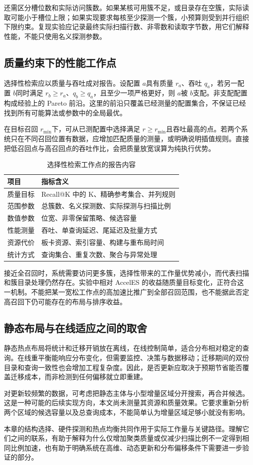 还需区分槽位数和实际访问簇数。如果某核可用簇不足，或目录存在空簇，实际读取可能小于槽位上限；如果实现要求每核至少探测一个簇，小预算则受到并行组织下限约束。复现实验应记录最终实际扫描行数、非零数和读取字节数，用它们解释性能，不能只使用名义探测参数。

\subsection{质量约束下的性能工作点}
选择性检索应以质量与吞吐成对报告。设配置 $a$具有质量 $r_a$、吞吐 $q_a$，若另一配置 $b$同时满足 $r_b\geq r_a$、$q_b\geq q_a$，且至少一项严格更好，则 $a$被 $b$支配。非支配配置构成经验上的 Pareto 前沿。这里的前沿只覆盖已经测量的配置集合，不保证已经找到所有可能算法或参数中的全局最优。

在目标召回 $r_{\min}$下，可从已测配置中选择满足 $r\geq r_{\min}$且吞吐最高的点。若两个系统只在不同召回位置有数据，应增加匹配质量的测量，或明确说明插值规则。直接把低召回点与高召回点的吞吐作比，会把质量放宽误算为纯执行优势。

\begin{table}[htbp]\centering\caption{选择性检索工作点的报告内容}
\begin{tabularx}{\textwidth}{p{2.8cm}X}\toprule
项目&指标含义\\\midrule
质量目标&Recall@K 中的 K、精确参考集合、并列规则\\
范围参数&总簇数、名义探测数、实际探测与扫描比例\\
数值参数&位宽、非零保留策略、候选容量\\
性能测量&吞吐、单查询延迟、尾延迟及批量方式\\
资源代价&板卡资源、索引容量、构建与重布局时间\\
统计方式&查询集合、重复次数、聚合与异常处理\\\bottomrule
\end{tabularx}\end{table}

接近全召回时，系统需要访问更多簇，选择性带来的工作量优势减小，而代表扫描和簇目录处理仍然存在。实验中相对 AccelES 的收益随质量目标变化，正符合这一机制。不能把某一宽松工作点的高加速比推广到全部召回范围，也不能据此否定高召回下仍可能存在的布局与排序收益。

\subsection{静态布局与在线适应之间的取舍}
静态热点布局将统计和迁移开销放在离线，在线控制简单，适合分布相对稳定的查询。在线重平衡能响应分布变化，但需要监控、决策与数据移动；迁移期间的双份目录和查询一致性也会增加工程复杂度。因此，是否更新应取决于预期节省能否覆盖迁移成本，而非检测到任何偏移就立即重建。

对更新较频繁的数据，可考虑把静态主体与小型增量区域分开搜索，再合并候选。这是一种可能的后续实现方向，本文尚未测量其资源和质量效果。它要求重新分析两个区域的候选容量以及总查询成本，不能简单认为增量区域足够小就没有影响。

本章的结构选择、硬件探测和热点均衡共同作用于实际工作量与关键路径。理解它们之间的联系，有助于解释为什么仅增加聚类质量或仅减少扫描比例不一定得到相同比例加速，也有助于明确系统在高维、动态更新和分布偏移条件下需要进一步验证的部分。

